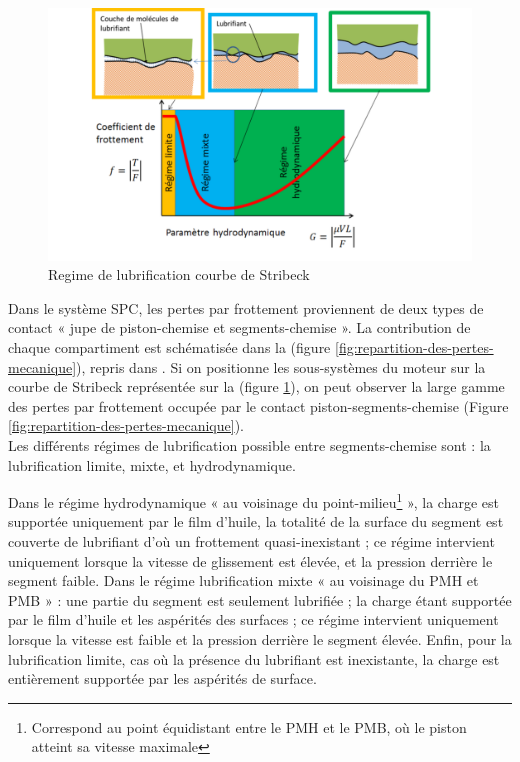 \begin{figure}[h]
	\centering
	\includegraphics[width=0.7\linewidth]{"Img/regime de lubrification"}
	\caption[Courbe de stribeck]{Regime de lubrification courbe de Stribeck \cite{initiation}}
	\label{fig:regime-de-lubrification}
\end{figure}

Dans le système SPC, les pertes par frottement proviennent de deux types de contact « jupe de piston-chemise et segments-chemise ». La contribution de chaque compartiment est schématisée dans la (figure \ref{fig:repartition-des-pertes-mecanique}), repris dans \cite{ayad2}. Si on positionne les sous-systèmes du moteur sur la courbe de Stribeck représentée sur la (figure  \ref{fig:regime-de-lubrification}), on peut observer la large gamme des pertes par frottement occupée par le contact piston-segments-chemise (Figure \ref{fig:repartition-des-pertes-mecanique}).\\

Les différents régimes de lubrification possible entre segments-chemise sont : la lubrification limite, mixte, et hydrodynamique.\cite{ayad2} 

Dans le régime hydrodynamique « au voisinage du point-milieu\footnote{Correspond au point équidistant entre le PMH et le PMB, où le piston atteint sa vitesse maximale} », la charge est supportée uniquement par le film d’huile, la totalité de la surface du segment est couverte de lubrifiant d’où un frottement quasi-inexistant ; ce régime intervient uniquement lorsque la vitesse de glissement est élevée, et la pression derrière le segment faible. Dans le régime lubrification mixte « au voisinage du PMH et PMB » : une partie du segment est seulement lubrifiée ; la charge étant supportée par le film d’huile et les aspérités des surfaces ; ce régime intervient uniquement lorsque la vitesse est faible et la pression derrière le segment élevée. Enfin, pour la lubrification limite, cas où la présence du lubrifiant est inexistante, la charge est entièrement supportée par les aspérités de surface.


